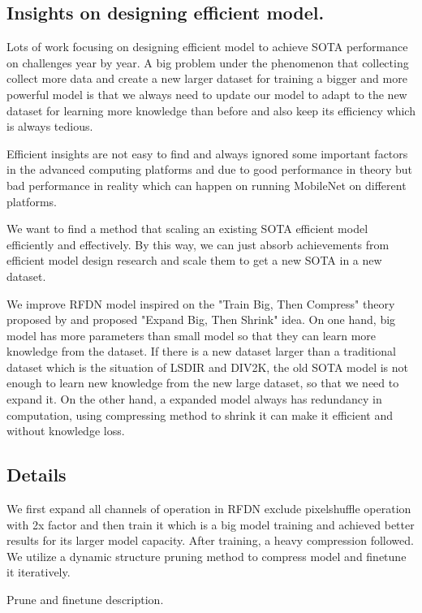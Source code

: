 \documentclass[10pt,twocolumn,letterpaper]{article}
\begin{document}
\subsection{Insights on designing efficient model.}
Lots of work focusing on designing efficient model to achieve SOTA performance on challenges year by year. A big problem under the phenomenon that collecting collect more data and create a new larger dataset for training a bigger and more powerful model is that we always need to update our model to adapt to the new dataset for learning more knowledge than before and also keep its efficiency which is always tedious.

Efficient insights are not easy to find and always ignored some important factors in the advanced computing platforms and due to good performance in theory but bad performance in reality which can happen on running MobileNet on different platforms.

We want to find a method that scaling an existing SOTA efficient model efficiently and effectively. By this way, we can just absorb achievements from efficient model design research and scale them to get a new SOTA in a new dataset.

We improve RFDN\cite{liu2020residual} model inspired on the "Train Big, Then Compress" theory proposed by \cite{li2020trainlarge} and proposed "Expand Big, Then Shrink" idea. On one hand, big model has more parameters than small model so that they can learn more knowledge from the dataset. If there is a new dataset larger than a traditional dataset which is the situation of LSDIR and DIV2K, the old SOTA model is not enough to learn new knowledge from the new large dataset, so that we need to expand it. On the other hand, a expanded model always has redundancy in computation, using compressing method to shrink it can make it efficient and without knowledge loss.

\subsection{Details}
We first expand all channels of operation in RFDN exclude pixelshuffle operation with 2x factor and then train it which is a big model training and achieved better results for its larger model capacity.
After training, a heavy compression followed.
We utilize a dynamic structure pruning method\cite{fang2023depgraph} to compress model and finetune it iteratively.

Prune and finetune description.
\end{document}
